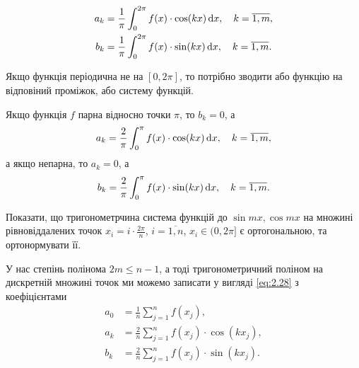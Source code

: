 \begin{align}
	\label{eq:2.31}
	a_k &= \frac{1}{\pi} \int_0^{2\pi} f(x) \cdot \cos (k x) \mathop{}\!\mathrm{d} x, \quad k = \overline{1, m}, \\
	\label{eq:2.32}
	b_k &= \frac{1}{\pi} \int_0^{2\pi} f(x) \cdot \sin (k x) \mathop{}\!\mathrm{d} x, \quad k = \overline{1, m}.
\end{align}

\begin{remark*}
	Якщо функція періодична не на $[0, 2 \pi]$, то потрібно зводити або функцію на відповіний проміжок, або систему функцій.
\end{remark*}

\begin{remark*}
	Якщо функція $f$ парна відносно точки $\pi$, то $b_k = 0$, а
	\begin{equation*}
		a_k = \frac{2}{\pi} \int_0^{\pi} f(x) \cdot \cos (k x) \mathop{}\!\mathrm{d} x, \quad k = \overline{1, m},
	\end{equation*}
	а якщо непарна, то $a_k = 0$, а
	\begin{equation*}
		b_k = \frac{2}{\pi} \int_0^{\pi} f(x) \cdot \sin (k x) \mathop{}\!\mathrm{d} x, \quad k = \overline{1, m}.
	\end{equation*}
\end{remark*}

\begin{problem}
	Показати, що тригонометрчина система функцій до $\sin m x, \cos m x$ на множині рівновіддалених точок $x_i = i \cdot \frac{2 \pi}{n}$, $i = \overline{1, n}$, $x_i \in (0, 2 \pi]$ є ортогональною, та ортонормувати її.
\end{problem}

\begin{remark*}
	У нас степінь полінома $2 m \le n - 1$, а тоді тригонометричний поліном на дискретній множині точок ми можемо записати у вигляді \eqref{eq:2.28} з коефіцієнтами
	\begin{align*}
		a_0 &= \frac1n \sum_{j = 1}^n f(x_j), \\
		a_k &= \frac2n \sum_{j = 1}^n f(x_j) \cdot \cos(k x_j), \\
		b_k &= \frac2n \sum_{j = 1}^n f(x_j) \cdot \sin(k x_j).
	\end{align*}
\end{remark*}

% 
